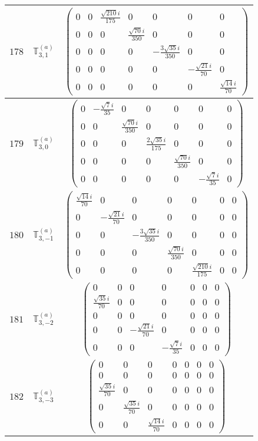 \documentclass[fleqn,8pt,landscape]{jsarticle}
\begin{document}
\begin{center}
\begin{longtable}{ccc}
$ 178 $ & $ \mathbb{T}_{3,1}^{(a)} $ & $ \begin{pmatrix} 0 & 0 & \frac{\sqrt{210} i}{175} & 0 & 0 & 0 & 0 \\ 0 & 0 & 0 & \frac{\sqrt{70} i}{350} & 0 & 0 & 0 \\ 0 & 0 & 0 & 0 & - \frac{3 \sqrt{35} i}{350} & 0 & 0 \\ 0 & 0 & 0 & 0 & 0 & - \frac{\sqrt{21} i}{70} & 0 \\ 0 & 0 & 0 & 0 & 0 & 0 & \frac{\sqrt{14} i}{70} \end{pmatrix} $ \\ \hline
$ 179 $ & $ \mathbb{T}_{3,0}^{(a)} $ & $ \begin{pmatrix} 0 & - \frac{\sqrt{7} i}{35} & 0 & 0 & 0 & 0 & 0 \\ 0 & 0 & \frac{\sqrt{70} i}{350} & 0 & 0 & 0 & 0 \\ 0 & 0 & 0 & \frac{2 \sqrt{35} i}{175} & 0 & 0 & 0 \\ 0 & 0 & 0 & 0 & \frac{\sqrt{70} i}{350} & 0 & 0 \\ 0 & 0 & 0 & 0 & 0 & - \frac{\sqrt{7} i}{35} & 0 \end{pmatrix} $ \\ \hline
$ 180 $ & $ \mathbb{T}_{3,-1}^{(a)} $ & $ \begin{pmatrix} \frac{\sqrt{14} i}{70} & 0 & 0 & 0 & 0 & 0 & 0 \\ 0 & - \frac{\sqrt{21} i}{70} & 0 & 0 & 0 & 0 & 0 \\ 0 & 0 & - \frac{3 \sqrt{35} i}{350} & 0 & 0 & 0 & 0 \\ 0 & 0 & 0 & \frac{\sqrt{70} i}{350} & 0 & 0 & 0 \\ 0 & 0 & 0 & 0 & \frac{\sqrt{210} i}{175} & 0 & 0 \end{pmatrix} $ \\ \hline
$ 181 $ & $ \mathbb{T}_{3,-2}^{(a)} $ & $ \begin{pmatrix} 0 & 0 & 0 & 0 & 0 & 0 & 0 \\ \frac{\sqrt{35} i}{70} & 0 & 0 & 0 & 0 & 0 & 0 \\ 0 & 0 & 0 & 0 & 0 & 0 & 0 \\ 0 & 0 & - \frac{\sqrt{21} i}{70} & 0 & 0 & 0 & 0 \\ 0 & 0 & 0 & - \frac{\sqrt{7} i}{35} & 0 & 0 & 0 \end{pmatrix} $ \\ \hline
$ 182 $ & $ \mathbb{T}_{3,-3}^{(a)} $ & $ \begin{pmatrix} 0 & 0 & 0 & 0 & 0 & 0 & 0 \\ 0 & 0 & 0 & 0 & 0 & 0 & 0 \\ \frac{\sqrt{35} i}{70} & 0 & 0 & 0 & 0 & 0 & 0 \\ 0 & \frac{\sqrt{35} i}{70} & 0 & 0 & 0 & 0 & 0 \\ 0 & 0 & \frac{\sqrt{14} i}{70} & 0 & 0 & 0 & 0 \end{pmatrix} $ \\ \hline

\end{longtable}
\end{center}
\end{document}
